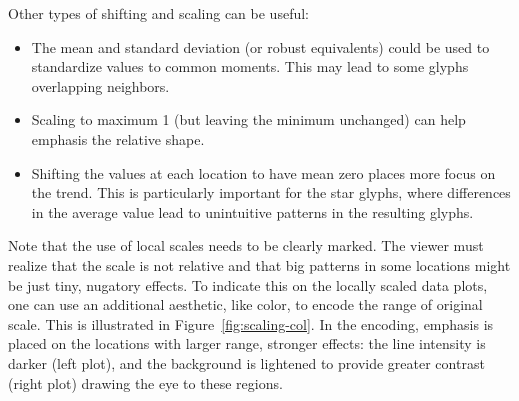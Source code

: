 \documentclass[oneside]{article}
\begin{document}
% 
% 
% 
% 

Other types of shifting and scaling can be useful:

\begin{itemize} \itemsep 0in

\item The mean and standard deviation (or robust equivalents) could be
  used to standardize values to common moments. This may lead to some
  glyphs overlapping neighbors.
  
   \item Scaling to maximum 1 (but leaving the minimum unchanged) can help
  emphasis the relative shape.

  \item Shifting the values at each location to have mean zero places more
  focus on the trend. This is particularly important for the star glyphs,
  where differences in the average value lead to unintuitive patterns in the
  resulting glyphs.

\end{itemize}

Note that the use of local scales needs to be clearly marked. The viewer must realize that the scale is not relative and that big patterns in some locations might be just tiny, nugatory effects. To indicate this on the locally scaled data plots, one can use an additional aesthetic, like color, to encode the range of original scale. This is illustrated in Figure~\ref{fig:scaling-col}. In the encoding, emphasis is placed on the locations with larger range, stronger effects: the line intensity is darker (left plot), and the background is lightened to provide greater contrast (right plot) drawing the eye to these regions. 
\end{document}

